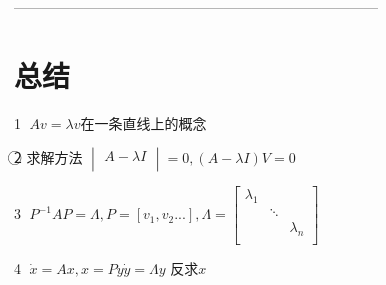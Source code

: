 \documentclass[12pt, a4paper, oneside]{ctexbook}
\begin{document}
------------------------------------------------------------------------------
\section{总结}

\textcircled{1} $Av=\lambda v$在一条直线上的概念

\textcircled{2} 求解方法 
$
\begin{vmatrix}
    A-\lambda I  \\
\end{vmatrix}=0,
(A-\lambda I)V=0
$

\textcircled{3} $P^{-1}AP=\Lambda,P=\left[v_1,v_2...\right],\Lambda=
\left[
    \begin{matrix}
        \lambda_1 && \\
        & \ddots & \\
        && \lambda_n \\
    \end{matrix}
\right]
$

\textcircled{4} $\dot x =Ax,x=Py \dot y=\Lambda y$ 反求$x$
\end{document}
